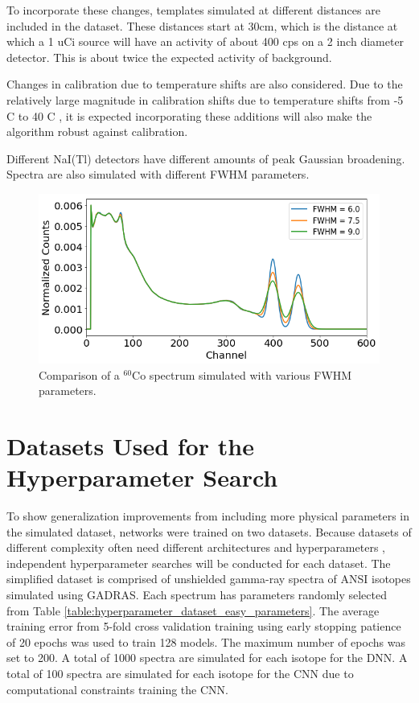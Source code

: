 To incorporate these changes, templates simulated at different distances are included in the dataset. These distances start at 30cm, which is the distance at which a 1 uCi source will have an activity of about 400 cps on a 2 inch diameter detector. This is about twice the expected activity of background. 

Changes in calibration due to temperature shifts are also considered. Due to the relatively large magnitude in calibration shifts due to temperature shifts from -5 C to 40 C \cite{CASANOVAS2012588}, it is expected incorporating these additions will also make the algorithm robust against calibration.

Different NaI(Tl) detectors have different amounts of peak Gaussian broadening. Spectra are also simulated with different FWHM parameters.


\begin{figure}[H]
\centering
\includegraphics[width=0.95\linewidth]{images/sim_spectra_FWHM_comparison}
\caption{Comparison of a $^{60}$Co spectrum simulated with various FWHM parameters.}
\label{fig:sim_spectra_FWHM_comparison}
\end{figure}


\section{Datasets Used for the Hyperparameter Search}

To show generalization improvements from including more physical parameters in the simulated dataset, networks were trained on two datasets. Because datasets of different complexity often need different architectures and hyperparameters \cite{Bergstra2012}, independent hyperparameter searches will be conducted for each dataset. The simplified dataset is comprised of unshielded gamma-ray spectra of ANSI isotopes simulated using GADRAS. Each spectrum has parameters randomly selected from Table \ref{table:hyperparameter_dataset_easy_parameters}. The average training error from 5-fold cross validation training using early stopping patience of 20 epochs was used to train 128 models. The maximum number of epochs was set to 200. A total of 1000 spectra are simulated for each isotope for the DNN. A total of 100 spectra are simulated for each isotope for the CNN due to computational constraints training the CNN.

